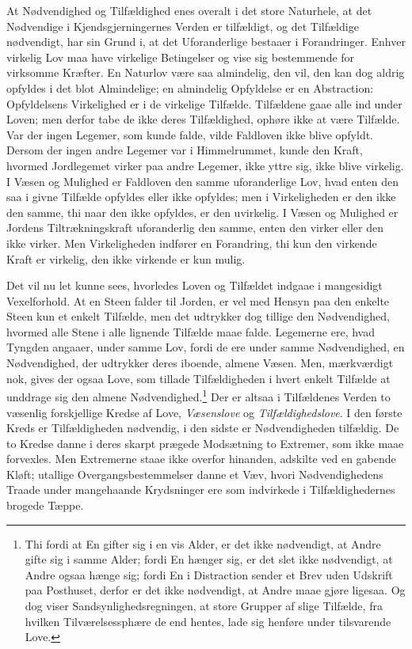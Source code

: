 \documentclass[12pt,a4paper]{book}
\begin{document}
At Nødvendighed og Tilfældighed enes overalt i det store
Naturhele, at det Nødvendige i Kjendsgjerningernes Verden er
tilfældigt, og det Tilfældige nødvendigt, har sin
Grund i, at det Uforanderlige bestaaer i Forandringer. Enhver
virkelig Lov maa have virkelige Betingelser og vise sig
bestemmende for virksomme Kræfter. En Naturlov være saa almindelig,
den vil, den kan dog aldrig opfyldes i det blot Almindelige; en
almindelig Opfyldelse er en Abstraction: Opfyldelsens Virkelighed
er i de virkelige Tilfælde. Tilfældene gaae alle ind under Loven;
men derfor tabe de ikke deres Tilfældighed, ophøre ikke at være
Tilfælde. Var der ingen Legemer, som kunde falde, vilde
Faldloven ikke blive opfyldt. Dersom der ingen andre Legemer var
i Himmelrummet, kunde den Kraft, hvormed Jordlegemet virker
paa andre Legemer, ikke yttre sig, ikke blive virkelig. I Væsen
og Mulighed er Faldloven den samme uforanderlige Lov, hvad
enten den saa i givne Tilfælde opfyldes eller ikke opfyldes; men
i Virkeligheden er den ikke den samme, thi naar den ikke
opfyldes, er den uvirkelig. I Væsen og Mulighed er Jordens
Tiltrækningskraft uforanderlig den samme, enten den virker eller den
ikke virker. Men Virkeligheden indfører en Forandring, thi kun
den virkende Kraft er virkelig, den ikke virkende er kun mulig.

Det vil nu let kunne sees, hvorledes Loven og Tilfældet
indgaae i mangesidigt Vexelforhold. At en Steen falder til Jorden,
er vel med Hensyn paa den enkelte Steen kun et enkelt Tilfælde,
men det udtrykker dog tillige den Nødvendighed, hvormed alle
Stene i alle lignende Tilfælde maae falde. Legemerne ere, hvad
Tyngden angaaer, under samme Lov, fordi de ere under samme
Nødvendighed, en Nødvendighed, der udtrykker deres iboende,
almene Væsen. Men, mærkværdigt nok, gives der ogsaa Love, som
tillade Tilfældigheden i hvert enkelt Tilfælde at unddrage sig den
almene Nødvendighed.\footnote{Thi fordi at En gifter sig i en vis
Alder, er det ikke nødvendigt, at Andre gifte sig i samme Alder;
fordi En hænger sig, er det slet ikke nødvendigt, at Andre ogsaa
hænge sig; fordi En i Distraction sender et Brev uden Udskrift
paa Posthuset, derfor er det ikke nødvendigt, at Andre maae gjøre
ligesaa. Og dog viser Sandsynlighedsregningen, at store Grupper
af slige Tilfælde, fra hvilken Tilværelsessphære de end hentes,
lade sig henføre under tilsvarende Love.}
Der er altsaa i Tilfældenes Verden to væsenlig forskjellige
Kredse af Love, \emph{Væsenslove} og \emph{Tilfældighedslove}.
I den første Kreds er Tilfældigheden nødvendig, i den sidste er
Nødvendigheden tilfældig. De to Kredse danne i deres skarpt
prægede Modsætning to Extremer, som ikke maae forvexles. Men
Extremerne staae ikke overfor hinanden, adskilte ved en gabende
Kløft; utallige Overgangsbestemmelser danne et Væv, hvori
Nødvendighedens Traade under mangehaande Krydsninger ere som
indvirkede i Tilfældighedernes brogede Tæppe.
\end{document}
